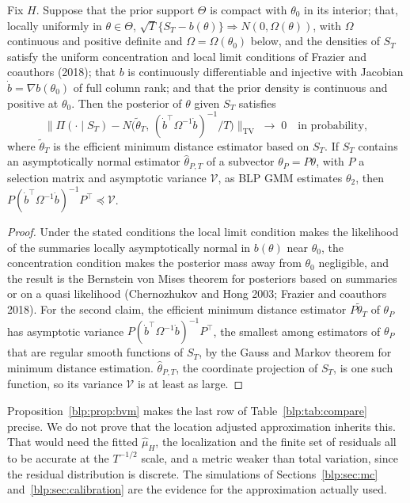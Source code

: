 \begin{proposition}\label{blp:prop:bvm}
Fix $H$. Suppose that the prior support $\Theta$ is compact with $\theta_0$ in its interior; that, locally uniformly in $\theta\in\Theta$,
$\sqrt T\{S_T - b(\theta)\}\Rightarrow N(0,\Omega(\theta))$, with $\Omega$ continuous and positive definite and $\Omega=\Omega(\theta_0)$ below, and the densities of $S_T$ satisfy the uniform concentration and local limit conditions of Frazier and coauthors (2018); that $b$ is continuously differentiable and
injective with Jacobian $\dot b = \nabla b(\theta_0)$ of full column rank; and that the prior density is
continuous and positive at $\theta_0$. Then the posterior of $\theta$ given $S_T$ satisfies
\[
\bigl\lVert \Pi(\cdot\mid S_T) - N\bigl(\tilde\theta_T,\, (\dot b^\top\Omega^{-1}\dot b)^{-1}/T\bigr)\bigr\rVert_{\mathrm{TV}}
\;\to\; 0\quad\text{in probability},
\]
where $\tilde\theta_T$ is the efficient minimum distance estimator based on $S_T$. If $S_T$ contains
an asymptotically normal estimator $\hat\theta_{P,T}$ of a subvector $\theta_P = P\theta$, with $P$ a selection
matrix and asymptotic variance $\mathcal V$, as BLP GMM estimates $\theta_2$, then
$P(\dot b^\top\Omega^{-1}\dot b)^{-1}P^\top\preceq\mathcal V$.
\end{proposition}
\begin{proof}
Under the stated conditions the local limit condition makes the likelihood of the summaries locally asymptotically normal in
$b(\theta)$ near $\theta_0$, the concentration condition makes the posterior mass away from $\theta_0$ negligible, and the result is the Bernstein von Mises theorem for posteriors based on
summaries or on a quasi likelihood (Chernozhukov and Hong 2003; Frazier and coauthors 2018). For the second
claim, the efficient minimum distance estimator $P\tilde\theta_T$ of $\theta_P$ has asymptotic variance
$P(\dot b^\top\Omega^{-1}\dot b)^{-1}P^\top$, the smallest among estimators of $\theta_P$ that are regular smooth
functions of $S_T$, by the Gauss and Markov theorem for minimum distance estimation. $\hat\theta_{P,T}$, the coordinate projection of $S_T$, is one such function, so its variance $\mathcal V$ is
at least as large.
\end{proof}

Proposition~\ref{blp:prop:bvm} makes the last row of Table~\ref{blp:tab:compare} precise. We do not prove that the location adjusted approximation inherits this. That would need the fitted $\hat\mu_H$, the localization and the finite set of residuals all to be accurate at the $T^{-1/2}$ scale, and a metric weaker than total variation, since the residual distribution is discrete. The simulations of Sections~\ref{blp:sec:mc} and~\ref{blp:sec:calibration} are the evidence for the approximation actually used.


